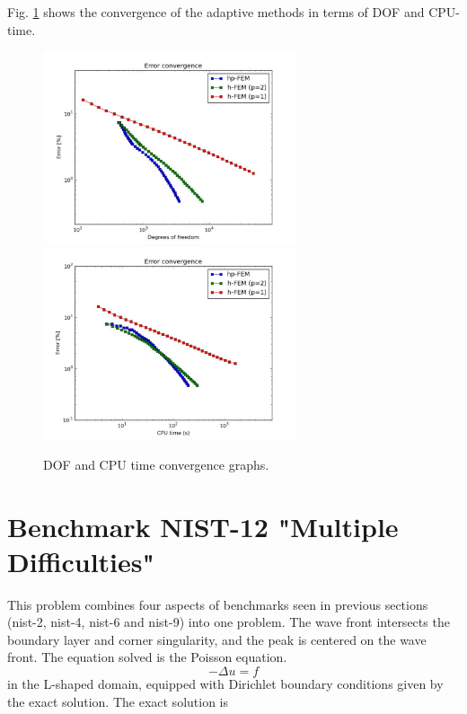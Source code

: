 \documentclass[12pt]{elsarticle}
\begin{document}
Fig. \ref{fig:nist-11-conv} shows the convergence of the adaptive methods in terms of DOF and CPU-time.

\begin{figure}[H]
\centering
\hspace{-50mm}
\includegraphics[width=7.5cm]{mafig69.pdf}\ \
\hspace{-10mm}
\includegraphics[width=7.5cm]{mafig70.pdf}
\hspace{-50mm}
\vspace{-2mm}
\caption{DOF and CPU time convergence graphs.}
\label{fig:nist-11-conv}
\end{figure}


\section{Benchmark NIST-12 "Multiple Difficulties"}
\label{sec:bench-12}

This problem combines four aspects of benchmarks
seen in previous sections (nist-2, nist-4, nist-6 and nist-9) into one problem.
The wave front intersects the boundary
layer and corner singularity, and the peak is centered on the wave front.
The equation solved is the Poisson equation.
\begin{equation} \label{multiple}
-\Delta u = f
\end{equation}
in the L-shaped domain, equipped with Dirichlet boundary conditions
given by the exact solution.
The exact solution is
\end{document}

